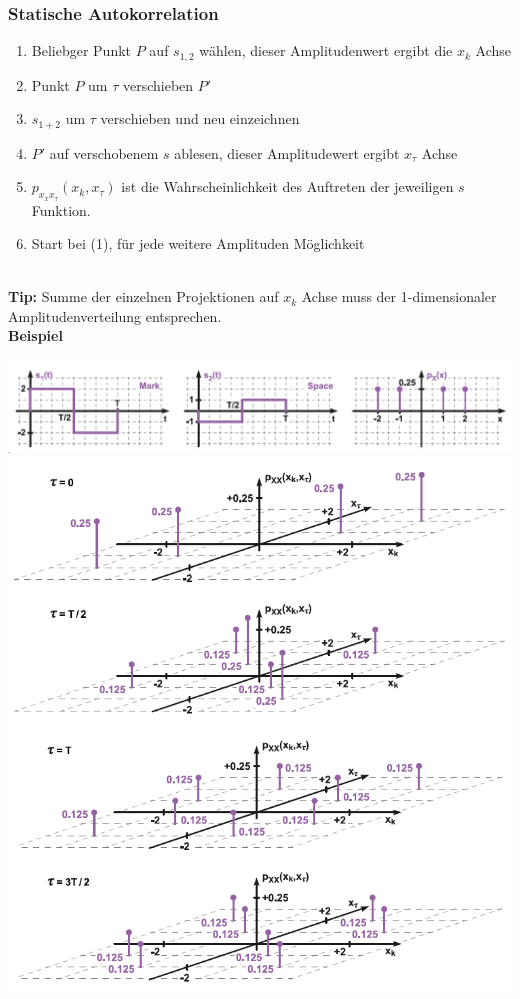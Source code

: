 \subsubsection{Statische Autokorrelation}
\begin{enumerate}[nosep]
	\item Beliebger Punkt $P$ auf $s_{1,2}$ wählen, dieser Amplitudenwert ergibt die $x_k$ Achse
	\item Punkt $P$ um $\tau$ verschieben $P'$
	\item $s_{1+2}$ um $\tau$ verschieben und neu einzeichnen
	\item $P'$ auf verschobenem $s$ ablesen, dieser Amplitudewert ergibt $x_\tau$ Achse
	\item $p_{x_xx_\tau}(x_k,x_\tau)$ ist die Wahrscheinlichkeit des Auftreten der jeweiligen $s$ Funktion. 
	\item Start bei (1), für jede weitere Amplituden Möglichkeit
\end{enumerate}
~\\
\textbf{Tip:} Summe der einzelnen Projektionen auf $x_k$ Achse muss der 1-dimensionaler Amplitudenverteilung entsprechen. ~\\

\noindent\textbf{Beispiel}
\begin{center}
	\includegraphics[width=\columnwidth]{Images/statische_ak1}
\includegraphics[width=0.8\columnwidth]{Images/statische_ak2}
\end{center}

